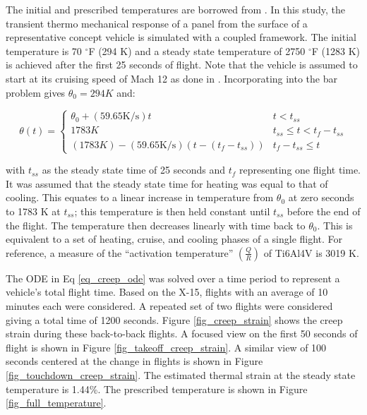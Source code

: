 \documentclass[conf]{new-aiaa}
\begin{document}
The initial and prescribed temperatures are borrowed from 
\cite{ culler_impact_of_FTS_coupling_on_response_prediction_hypersonic_skin_panels}.
In this study, the transient thermo mechanical response of a panel from the 
surface of a representative concept vehicle is simulated with a coupled framework.
The initial temperature is 70 $^{\circ}$F (294 K) and a steady state temperature 
of 2750 $^{\circ}$F (1283 K) is achieved after the first 25 seconds of flight.
Note that the vehicle is assumed to start at its cruising speed of Mach 12
as done in \cite{ culler_impact_of_FTS_coupling_on_response_prediction_hypersonic_skin_panels}.
Incorporating into the bar problem
gives $\theta_0 = 294 K$ and:

\begin{equation}
\theta(t) = \begin{cases}
 \theta_0 + (59.65 \text{K/s})t                & t < t_{ss} \\
1783 K                                         & t_{ss} \leq t < t_f-t_{ss} \\
(1783 K) - (59.65 \text{K/s})(t-(t_f-t_{ss}))  & t_f - t_{ss} \leq t
\end{cases}
\end{equation}

\noindent
with $t_{ss}$ as the steady state time of 25 seconds
and $t_f$ representing one flight time.
It was assumed that the steady state time for heating was
equal to that of cooling.
This equates to a linear increase in temperature from 
$\theta_0$ at zero seconds to 1783 K at $t_{ss}$;
this temperature is then held constant until $t_{ss}$ before
the end of the flight.
The temperature then decreases linearly with time back to $\theta_0$.
This is equivalent to a set of heating, cruise, and cooling phases of a single flight.
For reference, a measure of the ``activation temperature'' 
$\left(\frac{Q}{R}\right)$ of Ti6Al4V is 3019 K.

The ODE in Eq \ref{eq_creep_ode} was solved over a time period to represent a
vehicle's total flight time.
Based on the X-15, flights with an average of 10 minutes each 
\cite{ kordes_structureal_heating_experiencs_on_the_x15_airplane}
were considered.
A repeated set of two flights were considered giving a total time of 1200 seconds.
Figure \ref{fig_creep_strain} shows
the creep strain during these back-to-back flights.
A focused view on the first 50 seconds of flight is shown 
in Figure \ref{fig_takeoff_creep_strain}.
A similar view of 100 seconds centered at the change in flights is 
shown in Figure \ref{fig_touchdown_creep_strain}.
The estimated thermal strain at the steady state temperature is 1.44\%.
The prescribed temperature is shown in Figure \ref{fig_full_temperature}.
\end{document}
